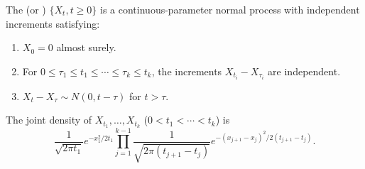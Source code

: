 The  (or ) $\{X_t, t \geq 0\}$ is a continuous-parameter normal process with independent increments satisfying:
\begin{enumerate}
\item $X_0 = 0$ almost surely.
\item For $0 \leq \tau_1 \leq t_1 \leq \cdots \leq \tau_k \leq t_k$, the increments $X_{t_i} - X_{\tau_i}$ are independent.
\item $X_t - X_\tau \sim N(0, t - \tau)$ for $t > \tau$.
\end{enumerate}

The joint density of $X_{t_1}, \ldots, X_{t_k}$ ($0 < t_1 < \cdots < t_k$) is
$$\frac{1}{\sqrt{2\pi t_1}} e^{-x_1^2/2t_1} \prod_{j=1}^{k-1} \frac{1}{\sqrt{2\pi(t_{j+1} - t_j)}} e^{-(x_{j+1} - x_j)^2/2(t_{j+1} - t_j)}.$$
